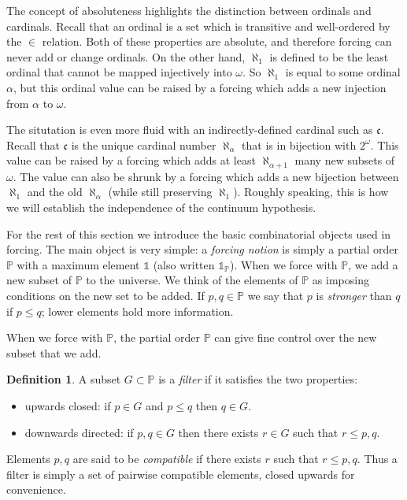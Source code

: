 \documentclass[11pt,oneside]{amsbook}
\newcommand{\PP}{\mathbb P}
\theoremstyle{definition}
\theoremstyle{plain}
\theoremstyle{definition}
\newtheorem{defn}[thm]{Definition}
\theoremstyle{remark}
\numberwithin{equation}{section}
\numberwithin{figure}{section}
\begin{document}
The concept of absoluteness highlights the distinction between ordinals and cardinals. Recall that an ordinal is a set which is transitive and well-ordered by the $\in$ relation. Both of these properties are absolute, and therefore forcing can never add or change ordinals. On the other hand, $\aleph_1$ is defined to be the least ordinal that cannot be mapped injectively into $\omega$. So $\aleph_1$ is equal to some ordinal $\alpha$, but this ordinal value can be raised by a forcing which adds a new injection from $\alpha$ to $\omega$.

The situtation is even more fluid with an indirectly-defined cardinal such as $\mathfrak c$. Recall that $\mathfrak c$ is the unique cardinal number $\aleph_\alpha$ that is in bijection with $2^\omega$. This value can be raised by a forcing which adds at least $\aleph_{\alpha+1}$ many new subsets of $\omega$. The value can also be shrunk by a forcing which adds a new bijection between $\aleph_1$ and the old $\aleph_\alpha$ (while still preserving $\aleph_1$). Roughly speaking, this is how we will establish the independence of the continuum hypothesis.

For the rest of this section we introduce the basic combinatorial objects used in forcing. The main object is very simple: a \emph{forcing notion} is simply a partial order $\PP$ with a maximum element $\mathbb1$ (also written $\mathbb1_\PP$). When we force with $\PP$, we add a new subset of $\PP$ to the universe. We think of the elements of $\PP$ as imposing conditions on the new set to be added. If $p,q\in\PP$ we say that $p$ is \emph{stronger} than $q$ if $p\leq q$; lower elements hold more information.

When we force with $\PP$, the partial order $\PP$ can give fine control over the new subset that we add.

\begin{defn}
  A subset $G\subset\PP$ is a \emph{filter} if it satisfies the two properties:
  \begin{itemize}
  \item upwards closed: if $p\in G$ and $p\leq q$ then $q\in G$.
  \item downwards directed: if $p,q\in G$ then there exists $r\in G$ such that $r\leq p,q$.
  \end{itemize}
\end{defn}

Elements $p,q$ are said to be \emph{compatible} if there exists $r$ such that $r\leq p,q$. Thus a filter is simply a set of pairwise compatible elements, closed upwards for convenience.
\end{document}
